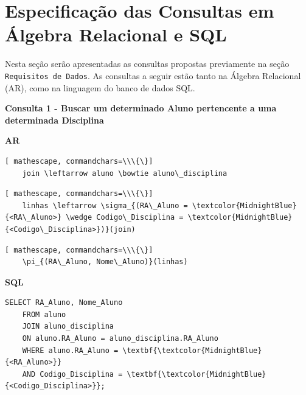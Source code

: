 \documentclass[12pt,a4paper]{article}
\begin{document}
\section{Especificação das Consultas em Álgebra Relacional e SQL}
Nesta seção serão apresentadas as consultas propostas previamente na seção \texttt{Requisitos de Dados}. As consultas a seguir estão tanto na Álgebra Relacional (AR), como na linguagem do banco de dados SQL.
\vspace{0.5cm}


\begin{center}
    \textbf{Consulta 1 - Buscar um determinado Aluno pertencente a uma determinada Disciplina}
\end{center}
\begin{center}
    \textbf{AR}
\end{center}

\begin{Verbatim}[ mathescape, commandchars=\\\{\}]
    join \leftarrow aluno \bowtie aluno\_disciplina
\end{Verbatim}
\begin{Verbatim}[ mathescape, commandchars=\\\{\}]
    linhas \leftarrow \sigma_{(RA\_Aluno = \textcolor{MidnightBlue}{<RA\_Aluno>} \wedge Codigo\_Disciplina = \textcolor{MidnightBlue}{<Codigo\_Disciplina>})}(join)
\end{Verbatim}
\begin{Verbatim}[ mathescape, commandchars=\\\{\}]
    \pi_{(RA\_Aluno, Nome\_Aluno)}(linhas)
\end{Verbatim}

\begin{center}
    \textbf{SQL}
\end{center}
\begin{Verbatim}[commandchars=\\\{\}]
    SELECT RA_Aluno, Nome_Aluno
    FROM aluno
    JOIN aluno_disciplina
    ON aluno.RA_Aluno = aluno_disciplina.RA_Aluno
    WHERE aluno.RA_Aluno = \textbf{\textcolor{MidnightBlue}{<RA_Aluno>}}
    AND Codigo_Disciplina = \textbf{\textcolor{MidnightBlue}{<Codigo_Disciplina>}};
\end{Verbatim}
\end{document}
